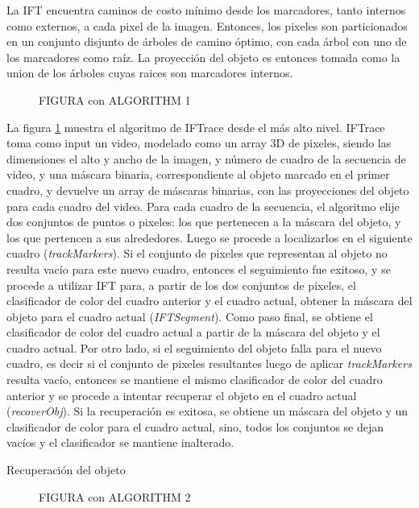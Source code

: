 \documentclass[a4paper,10pt]{article}
\begin{document}
La IFT encuentra caminos de costo mínimo desde los marcadores, tanto internos como externos, a cada pixel de la imagen. Entonces, los pixeles son particionados en un conjunto
disjunto de árboles de camino óptimo, con cada árbol con uno de los marcadores como raíz. La proyección del objeto es entonces tomada como la union de los árboles cuyas raices 
son marcadores internos.\\

 \begin{figure}[H]
        \caption{FIGURA con ALGORITHM 1}
        \label{fig:IFTrace-algorithm1}
\end{figure}


La figura \ref{fig:IFTrace-algorithm1} muestra el algoritmo de IFTrace desde el más alto nivel.
IFTrace toma como input un video, modelado como un array 3D de pixeles, siendo las dimensiones el alto y ancho de la imagen, y número de cuadro de la secuencia de video, y una 
máscara binaria, correspondiente al objeto marcado en el primer cuadro, y devuelve un array de máscaras binarias, con las proyecciones del objeto para cada cuadro del video.
Para cada cuadro de la secuencia, el algoritmo elije dos conjuntos de puntos o pixeles: los que pertenecen a la máscara del objeto, y los que pertencen a sus alrededores. Luego se 
procede 
a localizarlos en el siguiente cuadro (\textit{trackMarkers}). Si el conjunto de pixeles que representan al objeto no resulta vacío para este nuevo cuadro, entonces el seguimiento
fue exitoso, y se procede a utilizar IFT para, a partir de los dos conjuntos de pixeles, el clasificador de color del cuadro anterior y el cuadro actual, obtener la máscara del 
objeto para el cuadro actual (\textit{IFTSegment}). Como paso final, se obtiene el clasificador de color del cuadro actual a partir de la máscara del objeto y el cuadro actual.
Por otro lado, si el seguimiento del objeto falla para el nuevo cuadro, es decir si el conjunto de pixeles resultantes luego de aplicar \textit{trackMarkers} resulta vacío, 
entonces se mantiene el mismo clasificador de color del cuadro anterior y se procede
a intentar recuperar el objeto en el cuadro actual (\textit{recoverObj}). Si la recuperación
es exitosa, se obtiene un máscara del objeto y un clasificador de color para el cuadro actual,
sino, todos los conjuntos se dejan vacíos y el clasificador se mantiene inalterado.\

Recuperación del objeto\\
 \begin{figure}[H]
        \caption{FIGURA con ALGORITHM 2}
        \label{fig:IFTrace-algorithm2}
\end{figure}
\end{document}
